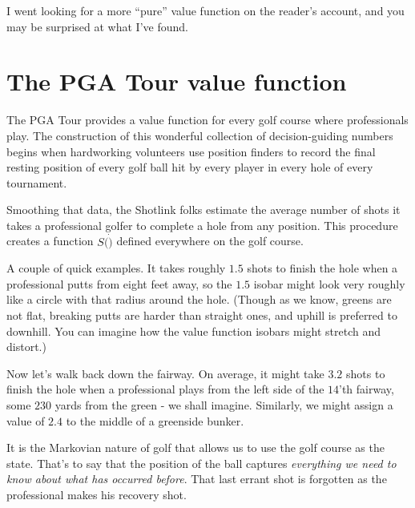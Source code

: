 I went looking for a more ``pure'' value function on the reader's account, and you may be surprised at what I've found. 

\section{The PGA Tour value function}
\label{section:golf}

The PGA Tour provides a value function for every golf course where professionals play. The construction of this wonderful collection of decision-guiding numbers begins when hardworking volunteers use position finders to record the final resting position of every golf ball hit by every player in every hole of every tournament. 

Smoothing that data, the Shotlink folks estimate the average number of shots it takes a professional golfer to complete a hole from any position. This procedure creates a function $S(\dot)$ defined everywhere on the golf course. 


A couple of quick examples. It takes roughly $1.5$ shots to finish the hole when a professional putts from eight feet away, so the $1.5$ isobar might look very roughly like a circle with that radius around the hole. (Though as we know, greens are not flat, breaking putts are harder than straight ones, and uphill is preferred to downhill. You can imagine how the value function isobars might stretch and distort.) 


Now let's walk back down the fairway. On average, it might take $3.2$ shots to finish the hole when a professional plays from the left side of the $14$'th fairway, some $230$ yards from the green - we shall imagine. Similarly, we might assign a value of $2.4$ to the middle of a greenside bunker. 

It is the Markovian nature of golf that allows us to use the golf course as the state. That's to say that the position of the ball captures {\em everything we need to know about what has occurred before}. That last errant shot is forgotten as the professional makes his recovery shot.  

